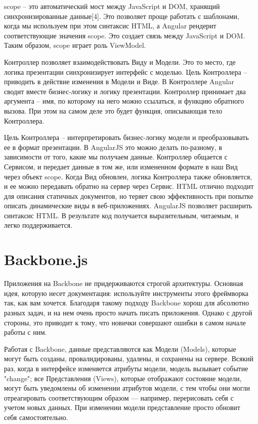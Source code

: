 \textdollar scope – это автоматический мост между JavaScript и DOM, хранящий синхронизированные данные[4]. Это позволяет проще работать с шаблонами, когда мы используем при этом синтаксис HTML, а Angular рендерит соответствующие значения \textdollar scope. Это создает связь между JavaScript и DOM. Таким образом, \textdollar scope играет роль ViewModel.

Контроллер позволяет взаимодействовать Виду и Модели. Это то место, где логика презентации синхронизирует интерфейс с моделью. Цель Контроллера – приводить в действие изменения в Модели и Виде. В Контроллере Angular сводит вместе бизнес-логику и логику презентации. Контроллер принимает два аргумента – имя, по которому на него можно ссылаться, и функцию обратного вызова. При этом на самом деле это будет функция, описывающая тело Контроллера.

Цель Контроллера – интерпретировать бизнес-логику модели и преобразовывать ее в формат презентации. В AngularJS это можно делать по-разному, в зависимости от того, какие мы получаем данные.
Контроллер общается с Сервисом, и передает данные в том же, или измененном формате в наш Вид через объект \textdollar scope. Когда Вид обновлен, логика Контроллера также обновляется, и ее можно передавать обратно на сервер через Сервис.
HTML отлично подходит для описания статичных документов, но теряет свою эффективность при попытке описать динамические виды в веб-приложениях. AngularJS позволяет расширить синтаксис HTML. В результате код получается выразительным, читаемым, и легко поддерживается.

\section {Backbone.js}

Приложения на Backbone не придерживаются строгой архитектуры. Основная идея, которую несет документация: используйте инструменты этого фреймворка так, как вам хочется. Благодаря такому подходу Backbone хорош для абсолютно разных задач, и на нем очень просто начать писать приложения. Однако с другой стороны, это приводит к тому, что новички совершают ошибки в самом начале работы с ним. 

Работая с Backbone, данные представляются как Модели (Models), которые могут быть созданы, провалидированы, удалены, и сохранены на сервере. Всякий раз, когда в интерфейсе изменяется атрибуты модели, модель вызывает событие "change"; все Представления (Views), которые отображают состояние модели, могут быть уведомлены об изменении атрибутов модели, с тем чтобы они могли отреагировать соответствующим образом — например, перерисовать себя с учетом новых данных. При изменении модели представление просто обновит себя самостоятельно.

